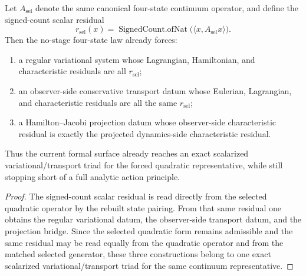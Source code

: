 \begin{theorem}
\label{thm:the-canonical-continuum-representative-already-carries-an-exact-scalarized-variational-triad}
Let \(A_{\mathrm{sel}}\) denote the same canonical four-state continuum
operator, and define the signed-count scalar residual
\[
r_{\mathrm{sel}}(x)=
\operatorname{SignedCount.ofNat}\!\bigl(\langle x,A_{\mathrm{sel}}x\rangle\bigr).
\]
Then the no-stage four-state law already forces:
\begin{enumerate}
\item a regular variational system whose Lagrangian, Hamiltonian, and
      characteristic residuals are all \(r_{\mathrm{sel}}\);
\item an observer-side conservative transport datum whose Eulerian,
      Lagrangian, and characteristic residuals are all the same
      \(r_{\mathrm{sel}}\);
\item a Hamilton--Jacobi projection datum whose observer-side characteristic
      residual is exactly the projected dynamics-side characteristic
      residual.
\end{enumerate}
Thus the current formal surface already reaches an exact scalarized
variational/transport triad for the forced quadratic representative, while
still stopping short of a full analytic action principle.
\end{theorem}

\begin{proof}
The signed-count scalar residual is read directly from the selected quadratic
operator by the rebuilt state pairing. From that same residual one obtains the
regular variational datum, the observer-side transport datum, and the
projection bridge. Since the selected quadratic form remains admissible and the
same residual may be read equally from the quadratic operator and from the
matched selected generator, these three constructions belong to one exact
scalarized variational/transport triad for the same continuum representative.
\end{proof}


